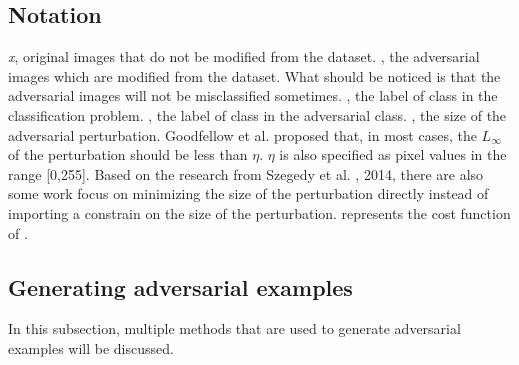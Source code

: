 \documentclass{article}
\begin{document}
\subsection{Notation}
\textit{x}, original images that do not be modified from the dataset.
, the adversarial images which are modified from the dataset. What should be noticed is that the adversarial images will not be misclassified sometimes.
, the label of class in the classification problem.
, the label of class in the adversarial class.
\texttit{$\eta$}, the size of the adversarial perturbation. Goodfellow et al. \cite{goodfellow2014explaining} proposed that, in most cases, the $L_\infty$ of the perturbation should be less than $\eta$. $\eta$ is also specified as pixel values in the range [0,255]. Based on the research from Szegedy et al. \cite{Szegedy42503}, 2014, there are also some work focus on minimizing the size of the perturbation directly instead of importing a constrain on the size of the perturbation.
 represents the cost function of . \subsection{Generating adversarial examples}
 In this subsection, multiple methods that are used to generate adversarial examples will be discussed.
\end{document}
